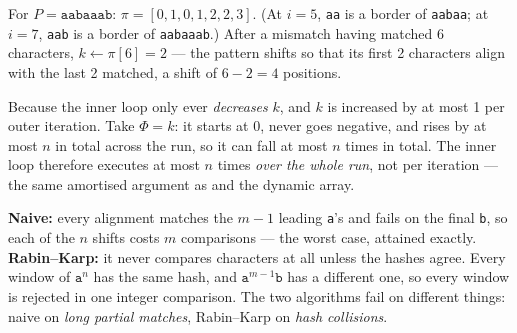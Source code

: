 \begin{ans}
  \item For $P = \texttt{aabaaab}$:
        $\pi = [0, 1, 0, 1, 2, 2, 3]$. (At $i=5$, \texttt{aa} is a border of
        \texttt{aabaa}; at $i=7$, \texttt{aab} is a border of
        \texttt{aabaaab}.) After a mismatch having matched 6 characters,
        $k \gets \pi[6] = 2$ --- the pattern shifts so that its first 2
        characters align with the last 2 matched, a shift of $6-2 = 4$
        positions.
  \item Because the inner loop only ever \emph{decreases} $k$, and $k$ is
        increased by at most 1 per outer iteration. Take $\Phi = k$: it starts
        at 0, never goes negative, and rises by at most $n$ in total across the
        run, so it can fall at most $n$ times in total. The inner loop
        therefore executes at most $n$ times \emph{over the whole run}, not per
        iteration --- the same amortised argument as  and
        the dynamic array.
  \item \textbf{Naive:} every alignment matches the $m-1$ leading
        \texttt{a}'s and fails on the final \texttt{b}, so each of the $n$
        shifts costs $m$ comparisons --- the worst case, attained exactly.
        \textbf{Rabin--Karp:} it never compares characters at all unless the
        hashes agree. Every window of $\texttt{a}^{n}$ has the same hash, and
        $\texttt{a}^{m-1}\texttt{b}$ has a different one, so every window is
        rejected in one integer comparison. The two algorithms fail on
        different things: naive on \emph{long partial matches}, Rabin--Karp on
        \emph{hash collisions}.
\end{ans}

